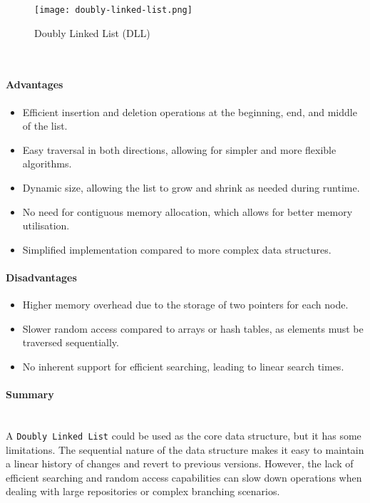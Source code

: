 \begin{figure}[!htbp]
    \centering
    \texttt{[image: doubly-linked-list.png]}
    \caption{Doubly Linked List (DLL) \cite{vaghani_2023}}
    \label{fig:doubly-linked-list}
\end{figure}
\hfill\medskip\\

\newpage

\paragraph{Advantages}
\begin{itemize}
    \item Efficient insertion and deletion operations at the beginning, end, and middle of the list.
    \item Easy traversal in both directions, allowing for simpler and more flexible algorithms.
    \item Dynamic size, allowing the list to grow and shrink as needed during runtime.
    \item No need for contiguous memory allocation, which allows for better memory utilisation.
    \item Simplified implementation compared to more complex data structures.
\end{itemize}
\paragraph{Disadvantages}
\begin{itemize}
    \item Higher memory overhead due to the storage of two pointers for each node.
    \item Slower random access compared to arrays or hash tables, as elements must be traversed sequentially.
    \item No inherent support for efficient searching, leading to linear search times.
\end{itemize}

\paragraph{Summary}
\hfill\medskip\\
A \lstinline{Doubly Linked List} could be used as the core data structure, but it has some limitations. The sequential nature of the data structure makes it easy to maintain a linear history of changes and revert to previous versions. However, the lack of efficient searching and random access capabilities can slow down operations when dealing with large repositories or complex branching scenarios.


